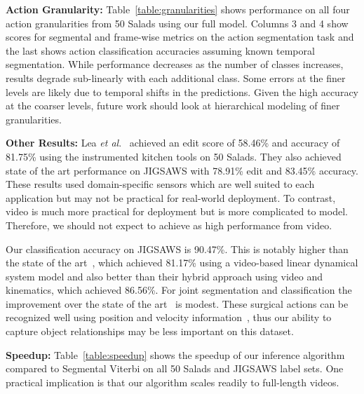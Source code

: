 \documentclass[runningheads]{llncs}
\newcommand{\fakesubsection}[1]{\smallskip\noindent\textbf{#1:}}
\newcommand{\etal}{\emph{et al}.}
\begin{document}
\fakesubsection{Action Granularity} Table~\ref{table:granularities} shows performance on all four action granularities from 50 Salads using our full model. Columns 3 and 4 show scores for segmental and frame-wise metrics on the action segmentation task and the last shows action classification accuracies assuming known temporal segmentation. 
While performance decreases as the number of classes increases, results degrade sub-linearly with each additional class. Some errors at the finer levels are likely due to temporal shifts in the predictions. 
Given the high accuracy at the coarser levels, future work should look at hierarchical modeling of finer granularities.


\fakesubsection{Other Results}
Lea \etal~\cite{lea_icra_2016} achieved an edit score of 58.46\% and accuracy of 81.75\% using the instrumented kitchen tools on 50 Salads. 
They also achieved state of the art performance on JIGSAWS with 78.91\% edit and 83.45\% accuracy.
These results used domain-specific sensors which are well suited to each application but may not be practical for real-world deployment. To contrast, video is much more practical for deployment but is more complicated to model. 
Therefore, we should not expect to achieve as high performance from video.

Our classification accuracy on JIGSAWS is 90.47\%. This is notably higher than the state of the art~\cite{zappella_media_2013}, which achieved 81.17\% using a video-based linear dynamical system model and also better than their hybrid approach using video and kinematics, which achieved 86.56\%.
For joint segmentation and classification the improvement over the state of the art~\cite{tao_miccai_2013} is modest. 
These surgical actions can be recognized well using position and velocity information~\cite{lea_icra_2016}, thus our ability to capture object relationships may be less important on this dataset. 

\fakesubsection{Speedup}
Table~\ref{table:speedup} shows the speedup of our inference algorithm compared to Segmental Viterbi on all 50 Salads and JIGSAWS label sets.
One practical implication is that our algorithm scales readily to full-length videos. 
\end{document}
